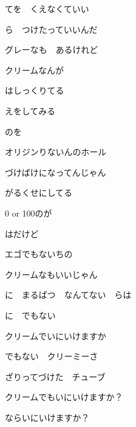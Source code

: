 \documentclass[a4paper,tate,twocolumn,12pt]{ltjtarticle}
\begin{document}
\begin{flushleft}
\vspace{2em}

\noindent\begin{minipage}{\linewidth}
てを　くえなくていい

ら　つけたっていいんだ

グレーなも　あるけれど

クリームなんが

はしっくりてる

えをしてみる
\end{minipage}

\vspace{2em}

\noindent\begin{minipage}{\linewidth}
のを

オリジンりないんのホール

づけばけになってんじゃん

がるくせにしてる

0 or 100のが

はだけど

エゴでもないちの

クリームなもいいじゃん
\end{minipage}

\vspace{2em}

\noindent\begin{minipage}{\linewidth}
に　まるばつ　なんてない　らは

に　でもない

クリームでいにいけますか

でもない　クリーミーさ

ざりってづけた　チューブ

クリームでもいにいけますか？

ならいにいけますか？
\end{minipage}

\end{flushleft}
\end{document}
